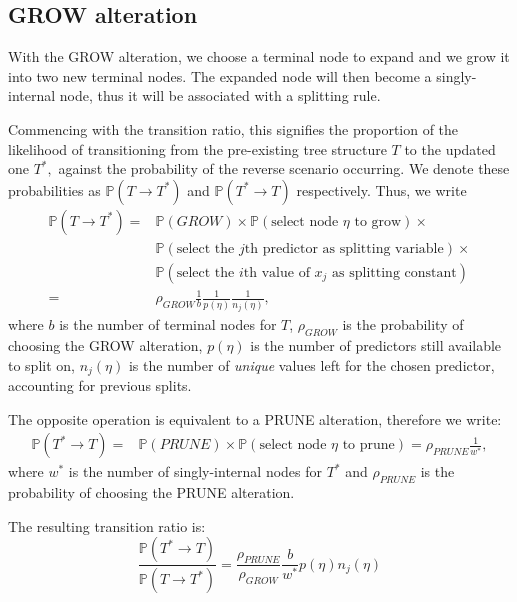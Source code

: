 \documentclass[11pt,a4paper]{article}
\newcommand{\prob}{\mathbb{P}}
\begin{document}
\subsection{GROW alteration}
With the GROW alteration, we choose a terminal node to expand and we grow it into two new terminal nodes. The expanded node will then become a singly-internal node, thus it will be associated with a splitting rule.

Commencing with the transition ratio, this signifies the proportion of the likelihood of transitioning from the pre-existing tree structure $T$ to the updated one $T^*,$ against the probability of the reverse scenario occurring. We denote these probabilities as $\prob(T \to T^*)$ and $\prob(T^* \to T)$ respectively. Thus, we write
\begin{equation}
    \label{eq:GROW_transition}
    \begin{split}
        \prob(T \to T^*)  = & \prob(GROW) \times \prob(\text{select node } \eta \text{ to grow}) \times   \\
                            & \prob(\text{select the } j\text{th predictor as splitting variable}) \times \\ & \prob(\text{select the } i\text{th value of } x_j \text{ as splitting constant}) \\
        =                   & \rho_{GROW}\frac{1}{b}\frac{1}{p(\eta)}\frac{1}{n_{j}(\eta)},
    \end{split}
\end{equation}
where $b$ is the number of terminal nodes for $T$, $\rho_{GROW}$ is the probability of choosing the GROW alteration, $p(\eta)$ is the number of predictors still available to split on, $n_{j}(\eta)$ is the number of \textit{unique} values left for the chosen predictor, accounting for previous splits.

The opposite operation is equivalent to a PRUNE alteration, therefore we write:
\begin{equation}
    \label{eq:GROW_transition_back}
    \begin{split}
        \prob(T^*\to T)  = & \prob(PRUNE) \times \prob(\text{select node } \eta \text{ to prune}) = \rho_{PRUNE}\frac{1}{w^*},
    \end{split}
\end{equation}
where $w^*$ is the number of singly-internal nodes for $T^*$ and $\rho_{PRUNE}$ is the probability of choosing the PRUNE alteration.

The resulting transition ratio is:
\begin{equation}
    \label{eq:GROW_transition_ratio}
    \frac{\prob(T^* \to T)}{\prob(T \to T^*)} = \frac{\rho_{PRUNE}}{\rho_{GROW}} \frac{b}{w^*}{p(\eta)n_{j}(\eta)}
\end{equation}
\end{document}
